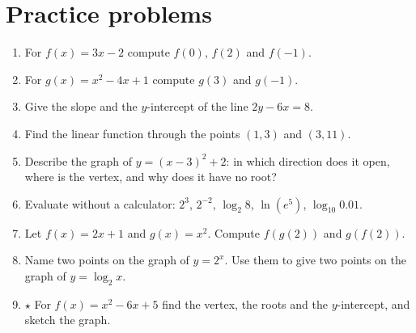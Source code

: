 \section*{Practice problems}
\begin{enumerate}[label=\textbf{\thechapter.\arabic*}]
  \item For $f(x)=3x-2$ compute $f(0)$, $f(2)$ and $f(-1)$.
  \item For $g(x)=x^2-4x+1$ compute $g(3)$ and $g(-1)$.
  \item Give the slope and the $y$-intercept of the line $2y-6x=8$.
  \item Find the linear function through the points $(1,3)$ and $(3,11)$.
  \item Describe the graph of $y=(x-3)^2+2$: in which direction does it open, where is the vertex, and why does it have no root?
  \item Evaluate without a calculator: $2^3$, $2^{-2}$, $\log_2 8$, $\ln(e^5)$, $\log_{10}0.01$.
  \item Let $f(x)=2x+1$ and $g(x)=x^2$. Compute $f(g(2))$ and $g(f(2))$.
  \item Name two points on the graph of $y=2^x$. Use them to give two points on the graph of $y=\log_2 x$.
  \item $\star$ For $f(x)=x^2-6x+5$ find the vertex, the roots and the $y$-intercept, and sketch the graph.
\end{enumerate}

